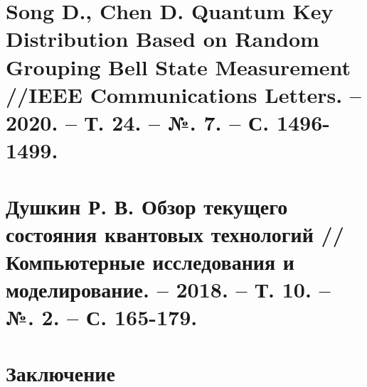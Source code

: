 \section{Song D., Chen D. Quantum Key Distribution Based on Random Grouping Bell State Measurement //IEEE Communications Letters. – 2020. – Т. 24. – №. 7. – С. 1496-1499.}
\blindtext
\section{Душкин Р. В. Обзор текущего состояния квантовых технологий //Компьютерные исследования и моделирование. – 2018. – Т. 10. – №. 2. – С. 165-179.}

\section*{Заключение}
\blindtext



